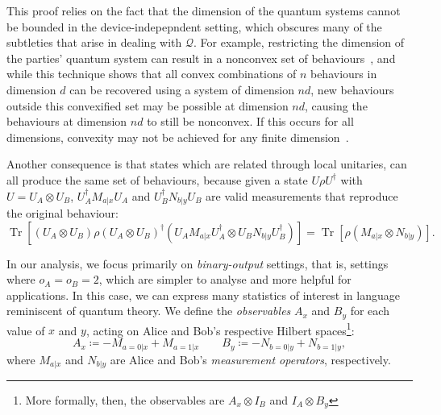 \documentclass[10pt, a4paper]{article}
\numberwithin{equation}{section} %
\theoremstyle{definition}
\theoremstyle{plain}
\newcommand{\?}{\mathrel{?}} %
\newcommand{\Tr}[2][]{\mathop{\mathrm{Tr}#1}\left[ #2 \right]} %
\newcommand{\Qs}{\mathcal{Q}}
\begin{document}
    This proof relies on the fact that the dimension of the quantum systems cannot be bounded in the device-indepepndent setting, which obscures many of the subtleties that arise in dealing with \(\Qs\). For example, restricting the dimension of the parties' quantum system can result in a nonconvex set of behaviours~\cite{FiniteDimNonconvex}, and while this technique shows that all convex combinations of \(n\) behaviours in dimension \(d\) can be recovered using a system of dimension \(nd\), new behaviours outside this convexified set may be possible at dimension \(nd\), causing the behaviours at dimension \(nd\) to still be nonconvex. If this occurs for all dimensions, convexity may not be achieved for any finite dimension~\cite[Sec. 4]{FiniteDimNonconvex}.

    Another consequence is that states which are related through local unitaries, can all produce the same set of behaviours, because given a state \(U\rho{U^{\dagger}}\) with \(U = U_A \otimes U_B\), \(U_A^{\dagger} M_{a|x} U_A\) and \(U_B^{\dagger} N_{b|y} U_B\) are valid measurements that reproduce the original behaviour:
    \begin{equation}
      \Tr{{(U_A \otimes U_B)} \rho {(U_A \otimes U_B)}^{\dagger} \left(U_A M_{a|x} U_A^{\dagger} \otimes U_B N_{b|y} U_B^{\dagger} \right)} = \Tr{ \rho \left(M_{a|x} \otimes N_{b|y} \right)}.
    \end{equation}

    In our analysis, we focus primarily on \emph{binary-output} settings, that is, settings where \(o_A = o_B = 2\), which are simpler to analyse and more helpful for applications. In this case, we can express many statistics of interest in language reminiscent of quantum theory. We define the \emph{observables} \(A_x\) and \(B_y\) for each value of \(x\) and \(y\), acting on Alice and Bob's respective Hilbert spaces\footnote{More formally, then, the observables are \(A_x \otimes I_B\) and \(I_A \otimes B_y\)}:
    \begin{equation} A_x \coloneqq -M_{a=0|x} + M_{a=1|x} \qquad B_y \coloneqq -N_{b=0|y} + N_{b=1|y}, \end{equation}
    where \(M_{a|x}\) and \(N_{b|y}\) are Alice and Bob's \emph{measurement operators}, respectively.
\end{document}
